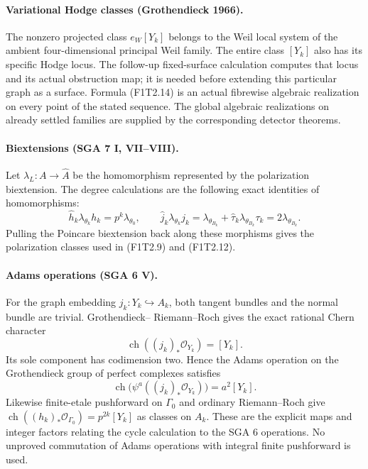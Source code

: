 \paragraph{Variational Hodge classes (Grothendieck 1966).}
The nonzero projected class $e_W[Y_k]$ belongs to the Weil local
system of the ambient four-dimensional principal Weil family.
The entire class $[Y_k]$ also has its specific Hodge locus.
The follow-up fixed-surface calculation computes that locus and
its actual obstruction map; it is needed before extending this
particular graph as a surface. Formula (F1T2.14) is an actual
fibrewise algebraic realization on every point of the stated
sequence. The global algebraic realizations on already settled
families are supplied by the corresponding detector theorems.

\paragraph{Biextensions (SGA 7 I, VII--VIII).}
Let $\lambda_L:A\to\widehat A$ be the homomorphism represented
by the polarization biextension. The degree calculations are
the following exact identities of homomorphisms:
\[
 \widehat h_k\lambda_{\theta_k}h_k=p^k\lambda_{\theta_0},
 \qquad
 \widehat j_k\lambda_{\theta_k}j_k
   =\lambda_{\theta_{B_k}}+
        \widehat\tau_k\lambda_{\theta_{B_k}}\tau_k
   =2\lambda_{\theta_{B_k}}.                             \tag{F1T5.1}
\]
Pulling the Poincare biextension back along these morphisms gives
the polarization classes used in (F1T2.9) and (F1T2.12).

\paragraph{Adams operations (SGA 6 V).}
For the graph embedding $j_k:Y_k\hookrightarrow A_k$, both
tangent bundles and the normal bundle are trivial. Grothendieck--
Riemann--Roch gives the exact rational Chern character
\[
 \operatorname{ch}((j_k)_*\mathcal O_{Y_k})=[Y_k].
\]
Its sole component has codimension two. Hence the Adams operation
on the Grothendieck group of perfect complexes satisfies
\[
 \operatorname{ch}\bigl(\psi^a((j_k)_*\mathcal O_{Y_k})\bigr)
       =a^2[Y_k].                                        \tag{F1T5.2}
\]
Likewise finite-etale pushforward on $\Gamma_0$ and ordinary
Riemann--Roch give
$\operatorname{ch}((h_k)_*\mathcal O_{\Gamma_0})
 =p^{2k}[Y_k]$ as classes on $A_k$.
These are the explicit maps and integer factors relating the
cycle calculation to the SGA 6 operations. No unproved
commutation of Adams operations with integral finite pushforward
is used.


